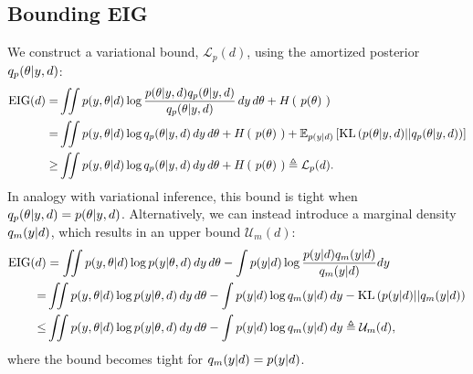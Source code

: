 \subsection{Bounding EIG}
We construct a variational bound, $\mathcal{L}_p(d)$, using the amortized posterior $q_p(\theta | y,d)$:
\begin{align}
	\text{EIG}(d) =& \iint  p(y, \theta | d) \log \frac{p(\theta | y, d)q_{{p}}(\theta | y,d)}{q_p(\theta | y,d)} \, dy \, d\theta + H\left(\ p(\theta)\ \right)  \\
	=& \iint p(y, \theta | d) \log q_p(\theta | y, d)  \, dy\, d\theta+H\left(\ p(\theta)\ \right) + \mathbb{E}_{p(y|d)} \left[\text{KL}\left(p(\theta | y,d)||q_p(\theta | y, d)\right)\right]\\
	\label{eq:postbound}
	\ge& \iint p(y, \theta | d) \log q_p(\theta | y, d) \, dy\, d\theta+H\left(\ p(\theta)\ \right) \triangleq \mathcal{L}_p(d).
\end{align}
In analogy with variational inference, this bound is tight when $q_p(\theta | y, d) = p(\theta | y, d)$.
%
Alternatively, we can instead introduce a marginal density $q_m(y|d)$, which results in an upper bound $\mathcal{U}_m(d)$:
\begin{align}
	\text{EIG}(d)&= \iint p(y, \theta | d) \log p(y | \theta, d) \, dy\, d\theta-\int p(y|d) \log \frac{p(y|d)q_m(y|d)}{q_m(y|d)} dy
	\\
	=& \iint p(y, \theta | d) \log p(y | \theta, d) \, dy\, d\theta-\int p(y|d) \log q_m(y|d) \, dy
	-\text{KL}\left(p(y|d)||q_m(y|d)\right)\\
	\label{eq:margbound}
	\le& \iint p(y, \theta | d) \log p(y | \theta, d) \, dy\, d\theta-\int p(y|d) \log q_m(y|d) \, dy
	\triangleq \mathcal{U}_m(d),
\end{align}
where the bound becomes tight for $q_m(y|d)=p(y|d)$.

